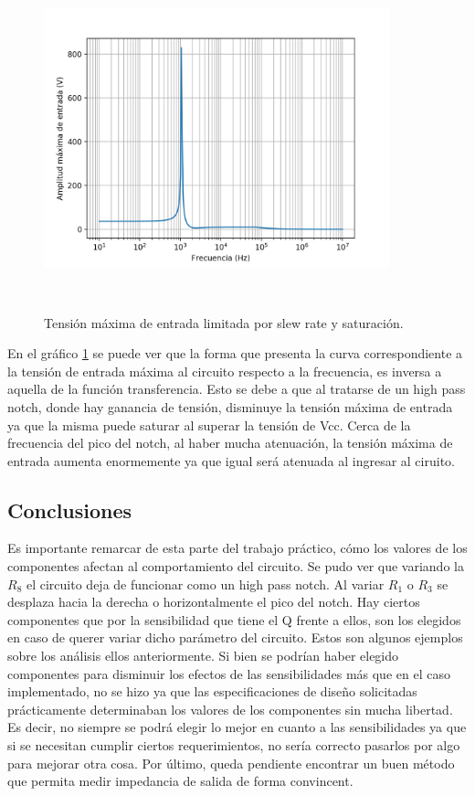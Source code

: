 \begin{figure}[H] %
	\centering
	\includegraphics[width=10cm,height=10cm,keepaspectratio]{../EJ1/00GRAFICOS/vinmaxtotal.png}
	\caption{Tensi\'on m\'axima de entrada limitada por slew rate y saturaci\'on.}
	\label{vinmaxtotal}
\end{figure}

En el gr\'afico \ref{vinmaxtotal} se puede ver que la forma que presenta la curva correspondiente a la tensi\'on de entrada m\'axima al circuito respecto a la frecuencia, es inversa a aquella de la funci\'on transferencia. Esto se debe a que al tratarse de un high pass notch, donde hay ganancia de tensi\'on, disminuye la tensi\'on m\'axima de entrada ya que la misma puede saturar al superar la tensi\'on de Vcc. Cerca de la frecuencia del pico del notch, al haber mucha atenuaci\'on, la tensi\'on m\'axima de entrada aumenta enormemente ya que igual ser\'a atenuada al ingresar al ciruito.



\subsection{Conclusiones}
Es importante remarcar de esta parte del trabajo pr\'actico, c\'omo los valores de los componentes afectan al comportamiento del circuito. Se pudo ver que variando la $R_8$ el circuito deja de funcionar como un high pass notch. Al variar $R_1$ o $R_3$ se desplaza hacia la derecha o horizontalmente el pico del notch. Hay ciertos componentes que por la sensibilidad que tiene el Q frente a ellos, son los elegidos en caso de querer variar dicho par\'ametro del circuito. Estos son algunos ejemplos sobre los an\'alisis ellos anteriormente. Si bien se podr\'ian haber elegido componentes para disminuir los efectos de las sensibilidades m\'as que en el caso implementado, no se hizo ya que las especificaciones de dise\~no solicitadas pr\'acticamente determinaban los valores de los componentes sin mucha libertad. Es decir, no siempre se podr\'a elegir lo mejor en cuanto a las sensibilidades ya que si se necesitan cumplir ciertos requerimientos, no ser\'ia correcto pasarlos por algo para mejorar otra cosa. Por \'ultimo, queda pendiente encontrar un buen m\'etodo que permita medir impedancia de salida de forma convincent.
